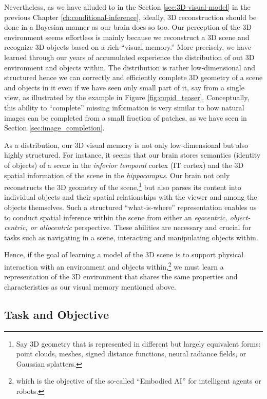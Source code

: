 \documentclass[../../book-main.tex]{subfiles}
\begin{document}
Nevertheless, as we have alluded to in the Section
\ref{sec:3D-visual-model} in the previous Chapter
\ref{ch:conditional-inference}, ideally, 3D reconstruction should be
done in a Bayesian manner as our brain does so too. Our perception of
the 3D environment seems effortless is mainly because we reconstruct
a 3D scene and recognize 3D objects based on a rich ``visual
memory.'' More precisely, we have learned through our years of
accumulated experience the distribution of out 3D environment and
objects within. The distribution is rather low-dimensional and
structured hence we can correctly and efficiently complete 3D
geometry of a scene and objects in it even if we have seen only small
part of it, say from a single view, as illustrated by the example in
Figure \ref{fig:cupid_teaser}. Conceptually, this ability to
``complete'' missing information is very similar to how natural
images can be completed from a small fraction of patches, as we have
seen in Section \ref{sec:image_completion}.

As a distribution, our 3D visual memory is not only low-dimensional
but also highly structured. For instance, it seems that our brain
stores semantics (identity of objects) of a scene in the {\em
inferior temporal} cortex (IT cortex) and the 3D spatial information
of the scene in the {\em hippocampus}. Our brain  not only
reconstructs the 3D geometry of the scene,\footnote{Say 3D geometry
that is represented in different but largely equivalent forms: point
clouds, meshes, signed distance functions, neural radiance fields, or
Gaussian splatters.} but also parses its content into individual
objects and their spatial relationships with the viewer and among the
objects themselves. Such a structured ``what-is-where''
representation enables us to conduct spatial inference within the
scene from either an {\em egocentric, object-centric, or allocentric}
perspective. These abilities are necessary and crucial for tasks such
as navigating in a scene, interacting and manipulating objects within.

Hence, if the goal of learning a model of the 3D scene is to support
physical interaction with an  environment and objects
within,\footnote{which is the objective of the so-called ``Embodied
AI'' for intelligent agents or robots.} we must learn a
representation of the 3D environment that shares the same properties
and characteristics as our visual memory mentioned above.

\subsection{Task and Objective}
\label{sub:cupid_objective}
\end{document}
